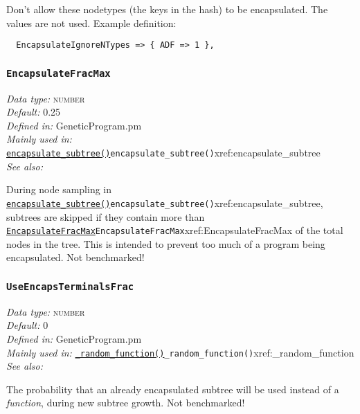 \documentclass[a4paper]{article}
\begin{document}
Don't allow these nodetypes (the keys in the hash) to be encapsulated.
The values are not used.  Example definition:
\begin{verbatim}
  EncapsulateIgnoreNTypes => { ADF => 1 },
\end{verbatim}

\subsubsection{\texttt{EncapsulateFracMax}}\label{xref:EncapsulateFracMax}
\begin{flushleft}
\textit{Data type:} \textsc{number}\\
\textit{Default:} 0.25\\
\textit{Defined in:} GeneticProgram.pm\\
\textit{Mainly used in:} \hyperref[no]{\texttt{encapsulate\_subtree()}}{\texttt{encapsulate\_subtree()}}{xref:encapsulate_subtree}\\
\textit{See also:}
\end{flushleft}

During node sampling in \hyperref[no]{\texttt{encapsulate\_subtree()}}{\texttt{encapsulate\_subtree()}}{xref:encapsulate_subtree}, subtrees are
skipped if they contain more than \hyperref[no]{\texttt{EncapsulateFracMax}}{\texttt{EncapsulateFracMax}}{xref:EncapsulateFracMax} of the
total nodes in the tree.  This is intended to prevent too much of a
program being encapsulated.  Not benchmarked!

\subsubsection{\texttt{UseEncapsTerminalsFrac}}\label{xref:UseEncapsTerminalsFrac}
\begin{flushleft}
\textit{Data type:} \textsc{number}\\
\textit{Default:} 0\\
\textit{Defined in:} GeneticProgram.pm\\
\textit{Mainly used in:} \hyperref[no]{\texttt{\_random\_function()}}{\texttt{\_random\_function()}}{xref:_random_function}\\
\textit{See also:}
\end{flushleft}

The probability that an already encapsulated subtree will be used
instead of a \textit{function}, during new subtree growth.  Not
benchmarked!
\end{document}
